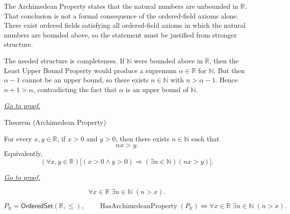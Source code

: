 
\begin{remark*}[Interpretation]
The Archimedean Property states that the natural numbers are unbounded in
$\mathbb{R}$. That conclusion is not a formal consequence of the ordered-field
axioms alone. There exist ordered fields satisfying all ordered-field axioms in
which the natural numbers are bounded above, so the statement must be justified
from stronger structure.

The needed structure is completeness. If $\mathbb{N}$ were bounded above in
$\mathbb{R}$, then the Least Upper Bound Property would produce a supremum
$\alpha \in \mathbb{R}$ for $\mathbb{N}$. But then $\alpha - 1$ cannot be an
upper bound, so there exists $n \in \mathbb{N}$ with $n > \alpha - 1$. Hence
$n+1 > \alpha$, contradicting the fact that $\alpha$ is an upper bound of
$\mathbb{N}$.

\smallskip
\noindent
\hyperref[prf:archimedean-property]{\textit{Go to proof.}}
\end{remark*}




\begin{theorembox}{Theorem (Archimedean Property)}
\begin{theorem}
\label{thm:archimedean-property}
For every $x,y\in\mathbb{R}$, if $x>0$ and $y>0$, then there exists
$n\in\mathbb{N}$ such that
\[
  nx>y.
\]
Equivalently,
\[
  (\forall x,y\in\mathbb{R})
  \bigl[(x>0\land y>0)\Longrightarrow(\exists n\in\mathbb{N})(nx>y)\bigr].
\]

\smallskip
\noindent
\hyperref[prf:archimedean-property]{\textit{Go to proof.}}
\end{theorem}
\end{theorembox}

\begin{remark*}
\[
\forall x\in\mathbb{R}\;\exists n\in\mathbb{N}\;(n>x).
\]
\end{remark*}

\begin{remark*}
\[
P_{\mathbb{R}}=\mathsf{OrderedSet}(\mathbb{R},\leq),\qquad
\operatorname{HasArchimedeanProperty}(P_{\mathbb{R}})\Longleftrightarrow
\forall x\in\mathbb{R}\;\exists n\in\mathbb{N}\;(n>x).
\]
\end{remark*}

